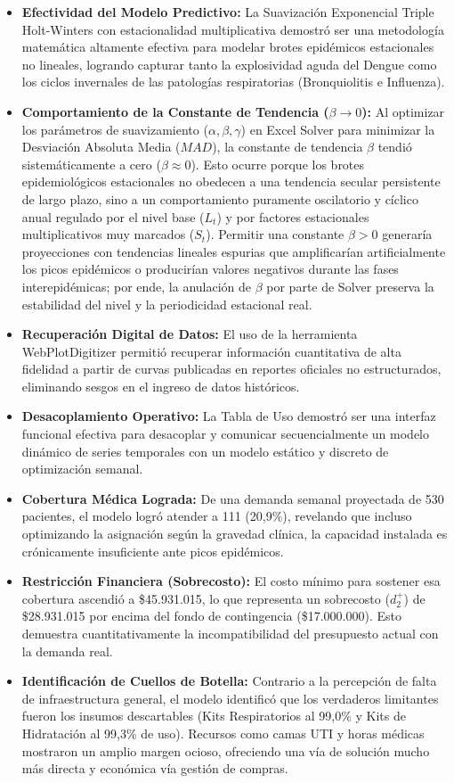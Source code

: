 \documentclass[conference]{IEEEtran}
\begin{document}
\begin{itemize}
    \item \textbf{Efectividad del Modelo Predictivo:} La Suavización Exponencial Triple Holt-Winters con estacionalidad multiplicativa demostró ser una metodología matemática altamente efectiva para modelar brotes epidémicos estacionales no lineales, logrando capturar tanto la explosividad aguda del Dengue como los ciclos invernales de las patologías respiratorias (Bronquiolitis e Influenza).
    \item \textbf{Comportamiento de la Constante de Tendencia ($\beta \to 0$):} Al optimizar los parámetros de suavizamiento ($\alpha, \beta, \gamma$) en Excel Solver para minimizar la Desviación Absoluta Media ($MAD$), la constante de tendencia $\beta$ tendió sistemáticamente a cero ($\beta \approx 0$). Esto ocurre porque los brotes epidemiológicos estacionales no obedecen a una tendencia secular persistente de largo plazo, sino a un comportamiento puramente oscilatorio y cíclico anual regulado por el nivel base ($L_t$) y por factores estacionales multiplicativos muy marcados ($S_t$). Permitir una constante $\beta > 0$ generaría proyecciones con tendencias lineales espurias que amplificarían artificialmente los picos epidémicos o producirían valores negativos durante las fases interepidémicas; por ende, la anulación de $\beta$ por parte de Solver preserva la estabilidad del nivel y la periodicidad estacional real.
    \item \textbf{Recuperación Digital de Datos:} El uso de la herramienta WebPlotDigitizer permitió recuperar información cuantitativa de alta fidelidad a partir de curvas publicadas en reportes oficiales no estructurados, eliminando sesgos en el ingreso de datos históricos.
    \item \textbf{Desacoplamiento Operativo:} La Tabla de Uso demostró ser una interfaz funcional efectiva para desacoplar y comunicar secuencialmente un modelo dinámico de series temporales con un modelo estático y discreto de optimización semanal.
    \item \textbf{Cobertura Médica Lograda:} De una demanda semanal proyectada de 530 pacientes, el modelo logró atender a 111 (20,9\%), revelando que incluso optimizando la asignación según la gravedad clínica, la capacidad instalada es crónicamente insuficiente ante picos epidémicos.
    \item \textbf{Restricción Financiera (Sobrecosto):} El costo mínimo para sostener esa cobertura ascendió a \$45.931.015, lo que representa un sobrecosto ($d_2^+$) de \$28.931.015 por encima del fondo de contingencia (\$17.000.000). Esto demuestra cuantitativamente la incompatibilidad del presupuesto actual con la demanda real.
    \item \textbf{Identificación de Cuellos de Botella:} Contrario a la percepción de falta de infraestructura general, el modelo identificó que los verdaderos limitantes fueron los insumos descartables (Kits Respiratorios al 99,0\% y Kits de Hidratación al 99,3\% de uso). Recursos como camas UTI y horas médicas mostraron un amplio margen ocioso, ofreciendo una vía de solución mucho más directa y económica vía gestión de compras.
\end{itemize}
\end{document}
